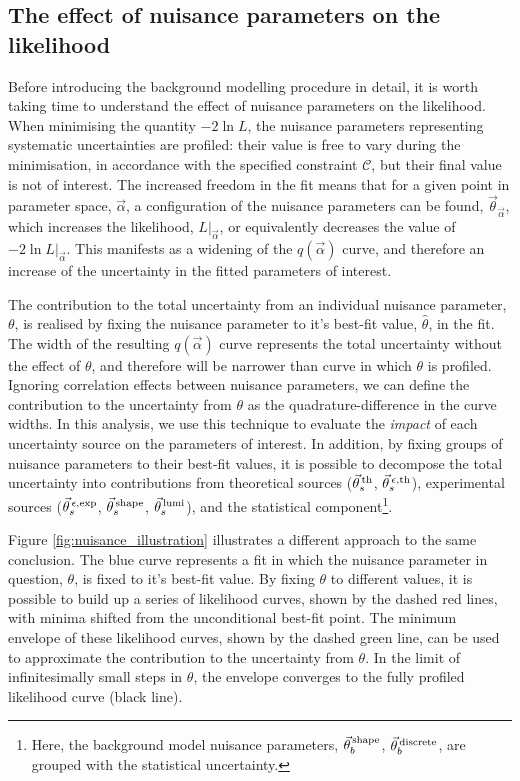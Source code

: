 \subsection{The effect of nuisance parameters on the likelihood}\label{sec:effect_of_nuisance}
Before introducing the background modelling procedure in detail, it is worth taking time to understand the effect of nuisance parameters on the likelihood. When minimising the quantity $-2\ln{L}$, the nuisance parameters representing systematic uncertainties are profiled: their value is free to vary during the minimisation, in accordance with the specified constraint $\mathcal{C}$, but their final value is not of interest. The increased freedom in the fit means that for a given point in parameter space, $\vec{\alpha}$, a configuration of the nuisance parameters can be found, $\vec{\theta}_{\vec{\alpha}}$, which increases the likelihood, $L|_{\vec{\alpha}}$, or equivalently decreases the value of $-2\ln{L}|_{\vec{\alpha}}$. This manifests as a widening of the $q(\vec{\alpha})$ curve, and therefore an increase of the uncertainty in the fitted parameters of interest.

The contribution to the total uncertainty from an individual nuisance parameter, $\theta$, is realised by fixing the nuisance parameter to it's best-fit value, $\hat{\theta}$, in the fit. The width of the resulting $q(\vec{\alpha})$ curve represents the total uncertainty without the effect of $\theta$, and therefore will be narrower than curve in which $\theta$ is profiled. Ignoring correlation effects between nuisance parameters, we can define the contribution to the uncertainty from $\theta$ as the quadrature-difference in the curve widths. In this analysis, we use this technique to evaluate the \textit{impact} of each uncertainty source on the parameters of interest. In addition, by fixing groups of nuisance parameters to their best-fit values, it is possible to decompose the total uncertainty into contributions from theoretical sources ($\vec{\theta}^{\,\rm{th}}_{s}$, $\vec{\theta}^{\,\epsilon,{\rm{th}}}_{s}$), experimental sources ($\vec{\theta}^{\,\epsilon,{\rm{exp}}}_{s}$, $\vec{\theta}^{\,\rm{shape}}_{s}$, $\vec{\theta}^{\,\rm{lumi}}_{s}$), and the statistical component\footnote{Here, the background model nuisance parameters, $\vec{\theta}^{\,\rm{shape}}_{b}$, $\vec{\theta}^{\,\rm{discrete}}_{b}$, are grouped with the statistical uncertainty.}. 

Figure \ref{fig:nuisance_illustration} illustrates a different approach to the same conclusion. The blue curve represents a fit in which the nuisance parameter in question, $\theta$, is fixed to it's best-fit value. By fixing $\theta$ to different values, it is possible to build up a series of likelihood curves, shown by the dashed red lines, with minima shifted from the unconditional best-fit point. The minimum envelope of these likelihood curves, shown by the dashed green line, can be used to approximate the contribution to the uncertainty from $\theta$. In the limit of infinitesimally small steps in $\theta$, the envelope converges to the fully profiled likelihood curve (black line).

